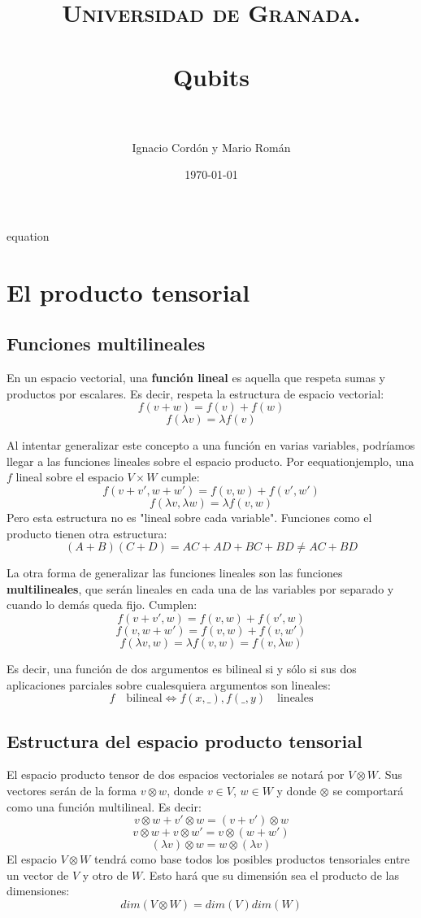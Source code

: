 \documentclass[paper=a4, fontsize=11pt, spanish]{scrartcl}
\title{
  \normalfont \normalsize 
  \textsc{Universidad de Granada.} \\ [25pt] %
  \horrule{0.5pt} \\[0.4cm] %
  \huge Qubits \\ %
  \horrule{2pt} \\[0.5cm] %
}
\author{Ignacio Cordón y Mario Román} %
\date{\normalsize\today} %
\numberwithin{equation}{section} %
\numberwithin{figure}{section} %
\numberwithin{table}{section} %
\begin{document}
\maketitle %
equation
\section {El producto tensorial}
  \subsection {Funciones multilineales}
    En un espacio vectorial, una \textbf{función lineal} es aquella que respeta sumas y productos por escalares.
    Es decir, respeta la estructura de espacio vectorial:
    $$ f(v+w) = f(v) + f(w) $$
    $$ f(\lambda v) = \lambda f(v) $$

    Al intentar generalizar este concepto a una función en varias variables, podríamos llegar a las funciones 
    lineales sobre el espacio producto. Por eequationjemplo, una $f$ lineal sobre el espacio $V \times W$ cumple:
    $$ f(v+v',w+w') = f(v,w) + f(v',w')$$
    $$ f(\lambda v, \lambda w) = \lambda f(v,w) $$
    Pero esta estructura no es "lineal sobre cada variable". Funciones como el producto tienen otra
    estructura:
    $$ (A+B)(C+D) = AC+AD+BC+BD \neq AC+BD $$
    
    La otra forma de generalizar las funciones lineales son las funciones \textbf{multilineales}, que serán lineales
    en cada una de las variables por separado y cuando lo demás queda fijo. Cumplen:
    $$ f(v+v',w) = f(v,w) + f(v',w) $$
    $$ f(v,w+w') = f(v,w) + f(v,w') $$
    $$ f(\lambda v,w) = \lambda f(v,w) = f(v,\lambda w) $$

    Es decir, una función de dos argumentos es bilineal si y sólo si sus dos aplicaciones parciales sobre
    cualesquiera argumentos son lineales:
    $$ f\quad \mbox{bilineal} \Leftrightarrow f(x,\_), f(\_,y)\quad \mbox{lineales} $$
    
  \subsection{Estructura del espacio producto tensorial}
    El espacio producto tensor de dos espacios vectoriales se notará por $V \otimes W$. Sus vectores serán de
    la forma $v \otimes w$, donde $v \in V$, $w \in W$ y donde $\otimes$ se comportará como una función multilineal.
    Es decir:
    $$ v \otimes w + v' \otimes w  = (v+v') \otimes w $$
    $$ v \otimes w + v \otimes w'  = v \otimes (w+w') $$
    $$ (\lambda v) \otimes w = w \otimes (\lambda v)  $$
    El espacio $V \otimes W$ tendrá como base todos los posibles productos tensoriales entre un vector de $V$ y otro
    de $W$. Esto hará que su dimensión sea el producto de las dimensiones:
    $$ dim(V \otimes W) = dim(V)dim(W) $$
    
\end{document}
